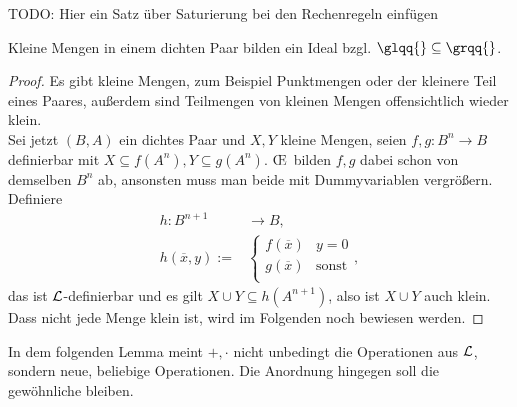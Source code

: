 TODO: Hier ein Satz über Saturierung bei den Rechenregeln einfügen

\begin{lemma}
	Kleine Mengen in einem dichten Paar bilden ein Ideal bzgl. $\glqq{}\subseteq\grqq{}$.
\end{lemma}
\begin{proof}
	Es gibt kleine Mengen, zum Beispiel Punktmengen oder der kleinere Teil eines Paares, außerdem sind Teilmengen von kleinen Mengen offensichtlich wieder klein.\\
	Sei jetzt $(B,A)$ ein dichtes Paar und $X,Y$ kleine Mengen, seien $f,g:B^n\rightarrow B$ definierbar mit $X\subseteq f(A^n),Y\subseteq g(A^n)$. \OE\ bilden $f,g$ dabei schon von demselben $B^n$ ab, ansonsten muss man beide mit Dummyvariablen vergrößern. Definiere
	\begin{align*}
	h:B^{n+1}&\rightarrow B,\\
	h(\overline{x},y):=&\left\{\begin{array}{ll}
	f(\overline{x})&y=0\\
	g(\overline{x})&\text{sonst}\\
	\end{array}\right.,
	\end{align*}
	das ist $\mathcal{L}$-definierbar und es gilt $X\cup Y\subseteq h(A^{n+1})$, also ist $X\cup Y$ auch klein.\\
	Dass nicht jede Menge klein ist, wird im Folgenden noch bewiesen werden.
\end{proof}

In dem folgenden Lemma meint $+,\cdot$ nicht unbedingt die Operationen aus $\mathcal{L}$, sondern neue, beliebige Operationen. Die Anordnung hingegen soll die gewöhnliche bleiben.

